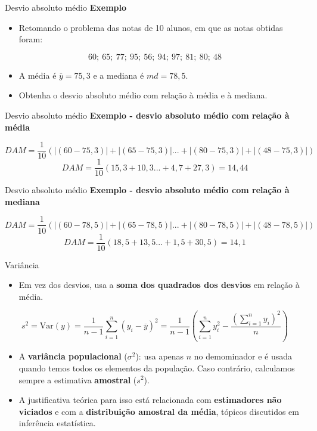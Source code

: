 \documentclass[
  ignorenonframetext,
  serif,
  professionalfont,
  usenames,
  dvipsnames,
  aspectratio = 169]{beamer}
\providecommand{\tightlist}{%
  \setlength{\itemsep}{0pt}\setlength{\parskip}{0pt}}
\renewcommand{\tightlist}{%
  \setlength{\itemsep}{0\baselineskip}
  \setlength{\parskip}{0.25\baselineskip}
}
\begin{document}
\begin{frame}{Desvio absoluto médio}
\label{desvio-absoluto-muxe9dio-1}
\textbf{Exemplo}

\begin{itemize}
\tightlist
\item
  Retomando o problema das notas de 10 alunos, em que as notas obtidas
  foram:
\end{itemize}

\[60;\ 65;\ 77;\ 95;\ 56;\ 94;\ 97;\ 81;\ 80;\ 48\]

\begin{itemize}
\item
  A média é \(\overline{y} = 75,3\) e a mediana é \(md = 78,5\).
\item
  Obtenha o desvio absoluto médio com relação à média e à mediana.
\end{itemize}
\end{frame}

\begin{frame}{Desvio absoluto médio}
\label{desvio-absoluto-muxe9dio-2}
\textbf{Exemplo - desvio absoluto médio com relação à média}

\[
DAM = \frac{1}{10}
       \left ( |(60 - 75,3)| + |(65 - 75,3)| ... + |(80 - 75,3)| + |(48 - 75,3)| \right )
\] \[
DAM = \frac{1}{10}
       \left ( 15,3 + 10,3 ... + 4,7  + 27,3  \right ) = 14,44
\]
\end{frame}

\begin{frame}{Desvio absoluto médio}
\label{desvio-absoluto-muxe9dio-3}
\textbf{Exemplo - desvio absoluto médio com relação à mediana}

\[
DAM = \frac{1}{10}
       \left ( |(60 - 78,5)| + |(65 - 78,5)| ... + |(80 - 78,5)| + |(48 - 78,5)| \right )
\] \[
DAM = \frac{1}{10}
       \left ( 18,5 + 13,5 ... + 1,5  + 30,5  \right ) = 14,1
\]
\end{frame}

\begin{frame}{Variância}
\label{variuxe2ncia}
\begin{itemize}
\tightlist
\item
  Em vez dos desvios, usa a \textbf{soma dos quadrados dos desvios} em
  relação à média.
\end{itemize}

\[
s^2 = \textrm{Var}(y) = \frac{1}{n - 1} \sum_{i = 1}^{n} (y_i - \overline{y})^2 = \frac{1}{n - 1}\left(\sum_{i = 1}^{n} y_i^2 - \frac{(\sum_{i = 1}^{n} y_i)^2}{n}\right)
\]

\begin{itemize}
\item
  A \textbf{variância populacional} (\(\sigma^2\)): usa apenas \(n\) no
  demominador e é usada quando temos todos os elementos da população.
  Caso contrário, calculamos sempre a estimativa \textbf{amostral}
  (\(s^2\)).
\item
  A justificativa teórica para isso está relacionada com
  \textbf{estimadores não viciados} e com a
  \textbf{distribuição amostral da média}, tópicos discutidos em
  inferência estatística.
\end{itemize}
\end{frame}
\end{document}
